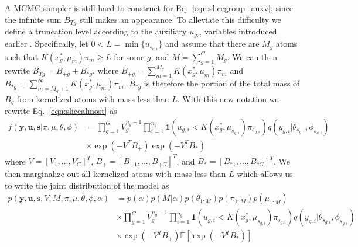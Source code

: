 \documentclass{article} %
\newcommand{\idf}[1]{\mathbf 1 \left ( #1 \right )}
\newcommand{\E}{\mathbb{E}}
\begin{document}
A MCMC sampler is still hard to
construct for Eq.~\ref{eqn:slicegroup_auxv}, since the infinite sum $B_{Tg}$ 
still makes an appearance.  To alleviate this difficulty we define a truncation
level according to the auxiliary $u_{g,i}$ variables introduced earlier 
\cite{KalliGriffinWalker:2011}.
Specifically, let $0 < L = \min{\{u_{s_{g,i}}\}}$ and assume that there are $M_g$
atoms such that $K(x^*_g,\mu_m)\pi_m \geq L$ for some $g$, and $M =
\sum_{g=1}^G M_g$.  We can then rewrite
$B_{Tg} = B_{+g}+B_{*g}$, where $B_{+g} = \sum_{m=1}^{M_g} K(x^*_g,\mu_m)\pi_m$ and $B_{*g} = \sum_{m=M_g+1}^\infty
K(x^*_g,\mu_m)\pi_m$. $B_{*g}$ is therefore the 
portion of the total mass of $B_g$ from kernelized atoms with mass less than $L$.
With this new notation we rewrite Eq.~\ref{eqn:slicealmost} as
\begin{equation}
  \begin{aligned}
    f({\mathbf y}, {\mathbf u}, {\mathbf s} | \pi, \mu, \theta, \phi) &=
    \prod_{g=1}^G V_g^{n_g-1} \prod_{i=1}^{n_g} \idf{ u_{g,i}
    < K(x^*_g,\mu_{s_{g,i}})\pi_{s_{g,i}} } q(y_{g,i} | \theta_{s_{g,i}},
    \phi_{s_{g,i}}) \\
    &\times \exp{(-V^T B_+)} \exp{(-V^T B_*)}
    \label{eqn:sliceonemore}
  \end{aligned}
\end{equation}
where $V = [V_1, \ldots, V_G]^T$, $B_+ = [B_{+1}, \ldots, B_{+G}]^T$, and $B_* =
[B_{*1}, \ldots, B_{*G}]^T$.  We
then marginalize out all kernelized atoms with mass less than $L$ which allows
us to write the joint distribution of the model as
\begin{equation}
  \label{eqn:slicejoint}
  \begin{aligned}
    p({\mathbf y}, {\mathbf u}, {\mathbf s}, V, M, \pi, \mu, \theta, \phi,
    \alpha) &= p(\alpha)p(M|\alpha)p(\theta_{1:M})p(\pi_{1:M})p(\mu_{1:M}) \\
    &\times \prod_{g=1}^G V_g^{n_g-1}\prod_{i=1}^{n_g} \idf{u_{g,i} <
    K(x^*_g,\mu_{s_{g,i}})\pi_{s_{g,i}}}
    q(y_{g,i}|\theta_{s_{g,i}},\phi_{s_{g,i}}) \\
    &\times \exp{(-V^TB_+)} \E[\exp{(-V^T B_*)}]
  \end{aligned}
\end{equation}
\end{document}
